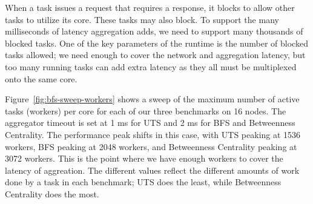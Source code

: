 When a task issues a request that requires a response, it blocks to
allow other tasks to utilize its core. These tasks may also block. To
support the many milliseconds of latency aggregation adds, we need to
support many thousands of blocked tasks. One of the key parameters of
the runtime is the number of blocked tasks allowed; we need enough to
cover the network and aggregation latency, but too many running tasks
can add extra latency as they all must be multiplexed onto the same core.

Figure~\ref{fig:bfs-sweep-workers} shows a sweep of the maximum number
of active tasks (workers) per core for each of our three benchmarks on
16 nodes. The aggregator timeout is set at 1 ms for UTS and 2 ms for
BFS and Betweenness Centrality. The performance peak shifts in this
case, with UTS peaking at 1536 workers, BFS peaking at 2048 workers,
and Betweenness Centrality peaking at 3072 workers. This is the point
where we have enough workers to cover the latency of aggreation. The
different values reflect the different amounts of work done by a task
in each benchmark; UTS does the least, while Betweenness Centrality does the most.

%
%
%


